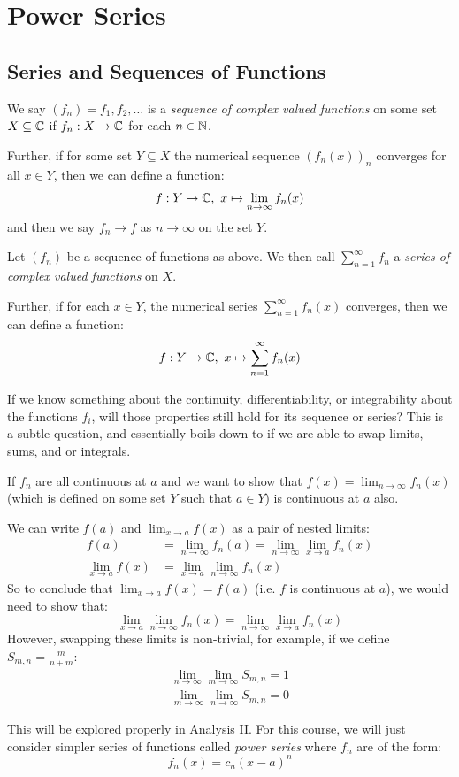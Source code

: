 \documentclass[../main.tex]{subfiles}
\begin{document}
\chapter{Power Series}
\section{Series and Sequences of Functions}
\begin{definition}
  We say $(f_n) = f_1, f_2, \ldots$ is a \textit{sequence of complex valued functions} on some set $X \subseteq \mathbb{C}$ if $f_n: X \to \mathbb{C}$ for each $n \in \mathbb{N}$.

  Further, if for some set $Y \subseteq X$ the numerical sequence $(f_n(x))_n$ converges for all $x \in Y$, then we can define a function:
  \[
    f: Y \to \mathbb{C},\ x \mapsto \lim_{n \to \infty} f_n(x)
  \]
  and then we say $f_n \to f$ as $n \to \infty$ on the set $Y$.
\end{definition}
\begin{definition}
  Let $(f_n)$ be a sequence of functions as above.
  We then call $\sum_{n = 1}^{\infty} f_n$ a \textit{series of complex valued functions} on $X$.

  Further, if for each $x \in Y$, the numerical series $\sum_{n = 1}^{\infty} f_n(x)$ converges, then we can define a function:
  \[
    f: Y \to \mathbb{C},\ x \mapsto \sum_{n = 1}^{\infty} f_n(x)
  \]
\end{definition}
If we know something about the continuity, differentiability, or integrability about the functions $f_i$, will those properties still hold for its sequence or series?
This is a subtle question, and essentially boils down to if we are able to swap limits, sums, and or integrals.
\begin{example}
  If $f_n$ are all continuous at $a$ and we want to show that $f(x) = \lim_{n \to \infty} f_n(x)$ (which is defined on some set $Y$ such that $a \in Y$) is continuous at $a$ also.

  We can write $f(a)$ and $\lim_{x \to a} f(x)$ as a pair of nested limits:
  \begin{align*}
    f(a) &= \lim_{n \to \infty} f_n(a) = \lim_{n \to \infty} \lim_{x \to a} f_n(x) \\
    \lim_{x \to a} f(x) &= \lim_{x \to a} \lim_{n \to \infty} f_n(x)
  \end{align*}
  So to conclude that $\lim_{x \to a} f(x) = f(a)$ (i.e. $f$ is continuous at $a$), we would need to show that:
  \[
    \lim_{x \to a} \lim_{n \to \infty} f_n(x) = \lim_{n \to \infty} \lim_{x \to a} f_n(x)
  \]
  However, swapping these limits is non-trivial, for example, if we define $S_{m, n} = \frac{m}{n + m}$:
  \begin{align*}
    \lim_{n \to \infty} \lim_{m \to \infty} S_{m, n} = 1 \\
    \lim_{m \to \infty} \lim_{n \to \infty} S_{m, n} = 0
  \end{align*}
\end{example}
This will be explored properly in Analysis II.
For this course, we will just consider simpler series of functions called \textit{power series} where $f_n$ are of the form:
\[
  f_n(x) = c_n(x - a)^{n}
\]
\end{document}
